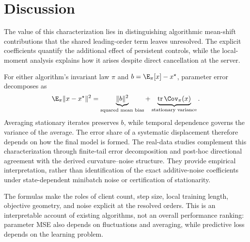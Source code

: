 \clearpage
\section{Discussion}
\label{sec:discussion}

The value of this characterization lies in distinguishing algorithmic
mean-shift contributions that the shared leading-order term leaves
unresolved. The explicit coefficients quantify the additional effect
of persistent controls, while the local-moment analysis explains how
it arises despite direct cancellation at the server.

For either algorithm's invariant law $\pi$ and $b=\E_\pi[x]-x^\star$,
parameter error decomposes as
\begin{equation}
\label{eq:stationary-bias-variance}
\E_\pi\|x-x^\star\|^2
=
\underbrace{\|b\|^2}_{\text{squared mean bias}}
+
\underbrace{\operatorname{tr}\Cov_\pi(x)}_{\text{stationary variance}}.
\end{equation}
Averaging stationary iterates preserves $b$, while temporal dependence governs
the variance of the average. The error share of a systematic displacement
therefore depends on how the final model is formed. The real-data studies
complement this characterization through finite-tail error decomposition
and post-hoc directional agreement with the derived curvature--noise
structure. They provide empirical interpretation, rather than identification
of the exact additive-noise coefficients under state-dependent minibatch
noise or certification of stationarity.

The formulas make the roles of client count, step size, local training
length, objective geometry, and noise explicit at the resolved orders.
This is an interpretable account of existing algorithms, not an overall
performance ranking: parameter MSE also depends on fluctuations and
averaging, while predictive loss depends on the learning problem.
